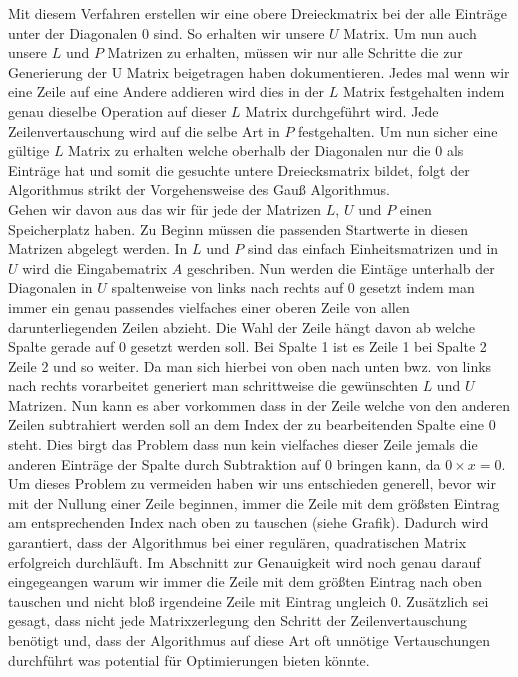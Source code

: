 \documentclass[course=erap]{aspdoc}
\begin{document}
Mit diesem Verfahren erstellen wir eine obere Dreieckmatrix bei der alle Einträge unter der 
Diagonalen 0 sind. So erhalten wir unsere $U$ Matrix. Um nun auch unsere $L$ und $P$ Matrizen zu erhalten, müssen
wir nur alle Schritte die zur Generierung der U Matrix beigetragen haben dokumentieren. Jedes mal wenn wir eine Zeile auf eine Andere addieren
wird dies in der $L$ Matrix festgehalten indem genau dieselbe Operation auf dieser $L$ Matrix durchgeführt wird. Jede Zeilenvertauschung wird auf die selbe Art in $P$ festgehalten.  
Um nun sicher eine gültige $L$ Matrix zu erhalten welche oberhalb der Diagonalen nur die 0 als Einträge hat und somit die gesuchte untere Dreiecksmatrix bildet, folgt der Algorithmus strikt der Vorgehensweise des Gauß Algorithmus.\\

Gehen wir davon aus das wir für jede der Matrizen $L$, $U$ und $P$ einen Speicherplatz haben.
Zu Beginn müssen die passenden Startwerte in diesen Matrizen abgelegt werden. In $L$ und $P$ sind das einfach Einheitsmatrizen und in $U$ wird die Eingabematrix $A$ geschriben. Nun werden die Eintäge unterhalb der Diagonalen in $U$ 
spaltenweise von links nach rechts auf 0 gesetzt indem man immer ein genau passendes vielfaches einer oberen Zeile von allen darunterliegenden 
Zeilen abzieht. Die Wahl der Zeile hängt davon ab welche Spalte gerade auf 0 gesetzt werden soll. 
Bei Spalte 1 ist es Zeile 1 bei Spalte 2 Zeile 2 und so weiter. Da man sich hierbei von oben nach unten bwz. von links nach rechts vorarbeitet generiert man schrittweise
die gewünschten $L$ und $U$ Matrizen. Nun kann es aber vorkommen dass in der Zeile welche von den anderen Zeilen subtrahiert werden soll an dem Index der zu bearbeitenden
Spalte eine 0 steht. Dies birgt das Problem dass nun kein vielfaches dieser Zeile jemals die anderen Einträge der Spalte durch Subtraktion auf 0 bringen kann,
da $ 0 \times x = 0$. Um dieses Problem zu vermeiden haben wir uns entschieden generell, bevor wir mit der Nullung einer Zeile beginnen, immer die Zeile mit dem größsten Eintrag
am entsprechenden Index nach oben zu tauschen (siehe Grafik). Dadurch wird garantiert, dass der Algorithmus bei einer regulären, quadratischen Matrix erfolgreich durchläuft. Im Abschnitt zur Genauigkeit wird noch genau darauf 
eingegeangen warum wir immer die Zeile mit dem größten Eintrag nach oben tauschen und nicht bloß irgendeine Zeile mit Eintrag ungleich 0.
Zusätzlich sei gesagt, dass nicht jede Matrixzerlegung den Schritt der Zeilenvertauschung benötigt und, dass der Algorithmus auf diese Art oft unnötige Vertauschungen durchführt was potential für 
Optimierungen bieten könnte.\\
 
\end{document}
